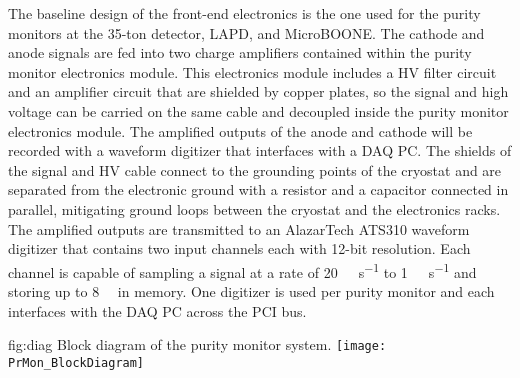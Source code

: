 The baseline design of the front-end electronics is the one used for the purity monitors at the 35-ton detector, LAPD, and MicroBOONE. The cathode and anode signals are fed into two charge amplifiers contained within the purity monitor electronics module. This electronics module includes a HV filter circuit and an amplifier circuit that are shielded by copper plates, so the signal and high voltage can be carried on the same cable and decoupled inside the purity monitor electronics module. The amplified outputs of the anode and cathode will be recorded with a waveform digitizer that interfaces with a DAQ PC. The shields of the signal and HV cable connect to the grounding points of the cryostat and are separated from the electronic ground with a resistor and a capacitor connected in parallel, mitigating ground loops between the cryostat and the electronics racks. The amplified outputs are transmitted to an AlazarTech ATS310 waveform digitizer that contains two input channels each with 12-bit resolution. Each channel is capable of sampling a signal at a rate of \SI{20}{\mega\samples\per\second} to \SI{1}{\kilo\samples\per\second} and storing up to \SI{8}{\mega\samples} in memory. One digitizer is used per purity monitor and each interfaces with the DAQ PC across the PCI bus. 

\begin{dunefigure}{fig:diag}
  {Block diagram of the purity monitor system.}
  \texttt{[image: PrMon\_BlockDiagram]}%
\end{dunefigure}

